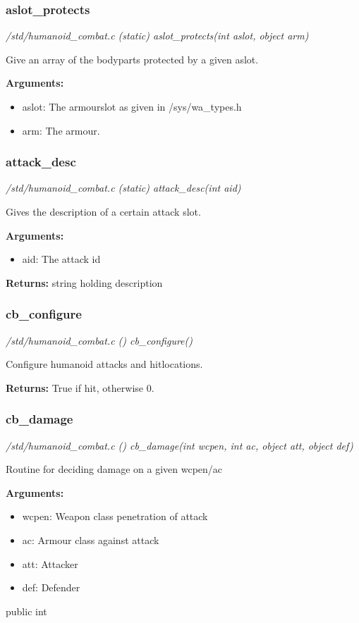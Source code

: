 \subsubsection{aslot\_protects}

{\em /std/humanoid\_combat.c (static) aslot\_protects(int aslot, object arm)}

Give an array of the bodyparts protected by a given
aslot.

{\bf Arguments:}
\begin{itemize}
\item     aslot: The armourslot as given in /sys/wa\_types.h
\item arm:   The armour.
\end{itemize}


\subsubsection{attack\_desc}

{\em /std/humanoid\_combat.c (static) attack\_desc(int aid)}

Gives the description of a certain attack slot.

{\bf Arguments:}
\begin{itemize}
\item      aid:   The attack id
\end{itemize}

{\bf Returns:}        string holding description


\subsubsection{cb\_configure}

{\em /std/humanoid\_combat.c () cb\_configure()}

Configure humanoid attacks and hitlocations.

{\bf Returns:}        True if hit, otherwise 0.


\subsubsection{cb\_damage}

{\em /std/humanoid\_combat.c () cb\_damage(int wcpen, int ac, object att, object def)}

Routine for deciding damage on a given wcpen/ac

{\bf Arguments:}
\begin{itemize}
\item     wcpen:    Weapon class penetration of attack
\item ac:       Armour class against attack
\item att:      Attacker
\item def:      Defender
\end{itemize}
public int


